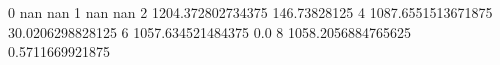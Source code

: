0 nan nan
1 nan nan
2 1204.372802734375 146.73828125
4 1087.6551513671875 30.0206298828125
6 1057.634521484375 0.0
8 1058.2056884765625 0.5711669921875
